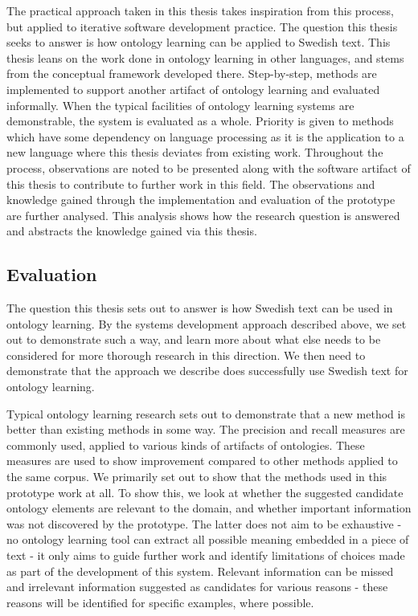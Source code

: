 \documentclass[a4paper]{report}
\begin{document}
The practical approach taken in this thesis takes inspiration from this process, but applied to iterative software development practice.
The question this thesis seeks to answer is how ontology learning can be applied to Swedish text.
This thesis leans on the work done in ontology learning in other languages, and stems from the conceptual framework developed there.
Step-by-step, methods are implemented to support another artifact of ontology learning and evaluated informally.
When the typical facilities of ontology learning systems are demonstrable, the system is evaluated as a whole.
Priority is given to methods which have some dependency on language processing as it is the application to a new language where this thesis deviates from existing work.
Throughout the process, observations are noted to be presented along with the software artifact of this thesis to contribute to further work in this field.
The observations and knowledge gained through the implementation and evaluation of the prototype are further analysed.
This analysis shows how the research question is answered and abstracts the knowledge gained via this thesis.

\subsection{Evaluation}
\label{sec:methods:evaluation}

The question this thesis sets out to answer is how Swedish text can be used in ontology learning.
By the systems development approach described above, we set out to demonstrate such a way, and learn more about what else needs to be considered for more thorough research in this direction.
We then need to demonstrate that the approach we describe does successfully use Swedish text for ontology learning.

Typical ontology learning research sets out to demonstrate that a new method is better than existing methods in some way.
The precision and recall measures are commonly used, applied to various kinds of artifacts of ontologies.
These measures are used to show improvement compared to other methods applied to the same corpus.
We primarily set out to show that the methods used in this prototype work at all.
To show this, we look at whether the suggested candidate ontology elements are relevant to the domain, and whether important information was not discovered by the prototype.
The latter does not aim to be exhaustive - no ontology learning tool can extract all possible meaning embedded in a piece of text - it only aims to guide further work and identify limitations of choices made as part of the development of this system.
Relevant information can be missed and irrelevant information suggested as candidates for various reasons - these reasons will be identified for specific examples, where possible.
\end{document}
